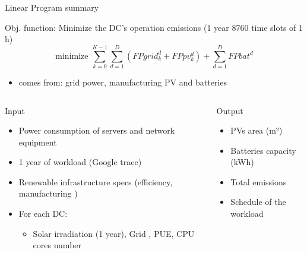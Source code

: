 \documentclass[Ligatures=TeX,table,svgnames,usetotalslideindicator,compress,10pt,aspectratio=169]{beamer}
\begin{document}
\begin{frame}{  Linear Program summary}

  \alert{Obj. function:} Minimize the DC's operation  emissions (1 year 8760 time slots of 1 h)
  \small   
 \begin{equation} \label{eq:FPALL}
    \text{minimize }\sum_{k=0}^{K-1} \sum_{d=1}^D ( FPgrid^d_k +  FPpv^d_k) + \sum_{d=1}^D FPbat^d
  \end{equation}
\normalsize
  \begin{itemize}
  \item {} comes from: grid power, manufacturing PV and batteries
  \end{itemize}
  
  \begin{columns}[T]
    \begin{column}{0.55\textwidth}
      \pause
      \alert{Input}

      \begin{itemize}
      \item Power consumption of servers and network equipment
      \item 1 year of workload  (Google trace)
      \item Renewable infrastructure specs (efficiency, manufacturing )
      \item For each DC:
        \begin{itemize}
        \item Solar irradiation (1 year), Grid , PUE, CPU cores number
        \end{itemize}
      \end{itemize}
      
    \end{column}

    \begin{column}{0.45\textwidth}
      
      \pause          
      \alert{Output}
      
      \begin{itemize}          
      \item PVs area (m²)          
      \item Batteries capacity (kWh)                  
      \item Total  emissions 
      \item Schedule of the workload         
      \end{itemize}
    \end{column}
  \end{columns}      
\end{frame}
\end{document}
